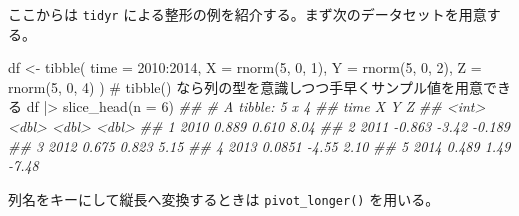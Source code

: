 \documentclass[
  letterpaper,
  xelatex,
  ja=standard, xelatex]{bxjsbook}
\newenvironment{Shaded}{\begin{snugshade}}{\end{snugshade}}
\newcommand{\AttributeTok}[1]{\textcolor[rgb]{0.40,0.45,0.13}{#1}}
\newcommand{\CommentTok}[1]{\textcolor[rgb]{0.37,0.37,0.37}{#1}}
\newcommand{\DecValTok}[1]{\textcolor[rgb]{0.68,0.00,0.00}{#1}}
\newcommand{\DocumentationTok}[1]{\textcolor[rgb]{0.37,0.37,0.37}{\textit{#1}}}
\newcommand{\FunctionTok}[1]{\textcolor[rgb]{0.28,0.35,0.67}{#1}}
\newcommand{\NormalTok}[1]{\textcolor[rgb]{0.00,0.23,0.31}{#1}}
\newcommand{\OtherTok}[1]{\textcolor[rgb]{0.00,0.23,0.31}{#1}}
\newcommand{\SpecialCharTok}[1]{\textcolor[rgb]{0.37,0.37,0.37}{#1}}
\begin{document}
ここからは \texttt{tidyr}
による整形の例を紹介する。まず次のデータセットを用意する。

\begin{Shaded}
\begin{Highlighting}[]
\NormalTok{df }\OtherTok{\textless{}{-}} \FunctionTok{tibble}\NormalTok{(}
  \AttributeTok{time =} \DecValTok{2010}\SpecialCharTok{:}\DecValTok{2014}\NormalTok{,}
  \AttributeTok{X =} \FunctionTok{rnorm}\NormalTok{(}\DecValTok{5}\NormalTok{, }\DecValTok{0}\NormalTok{, }\DecValTok{1}\NormalTok{),}
  \AttributeTok{Y =} \FunctionTok{rnorm}\NormalTok{(}\DecValTok{5}\NormalTok{, }\DecValTok{0}\NormalTok{, }\DecValTok{2}\NormalTok{),}
  \AttributeTok{Z =} \FunctionTok{rnorm}\NormalTok{(}\DecValTok{5}\NormalTok{, }\DecValTok{0}\NormalTok{, }\DecValTok{4}\NormalTok{)}
\NormalTok{)}
\CommentTok{\# \textasciigrave{}tibble()\textasciigrave{} なら列の型を意識しつつ手早くサンプル値を用意できる}
\NormalTok{df }\SpecialCharTok{|\textgreater{}} \FunctionTok{slice\_head}\NormalTok{(}\AttributeTok{n =} \DecValTok{6}\NormalTok{)}
\DocumentationTok{\#\# \# A tibble: 5 x 4}
\DocumentationTok{\#\#    time       X      Y      Z}
\DocumentationTok{\#\#   \textless{}int\textgreater{}   \textless{}dbl\textgreater{}  \textless{}dbl\textgreater{}  \textless{}dbl\textgreater{}}
\DocumentationTok{\#\# 1  2010  0.889   0.610  8.04 }
\DocumentationTok{\#\# 2  2011 {-}0.863  {-}3.42  {-}0.189}
\DocumentationTok{\#\# 3  2012  0.675   0.823  5.15 }
\DocumentationTok{\#\# 4  2013  0.0851 {-}4.55   2.10 }
\DocumentationTok{\#\# 5  2014  0.489   1.49  {-}7.48}
\end{Highlighting}
\end{Shaded}

列名をキーにして縦長へ変換するときは \texttt{pivot\_longer()} を用いる。
\end{document}
